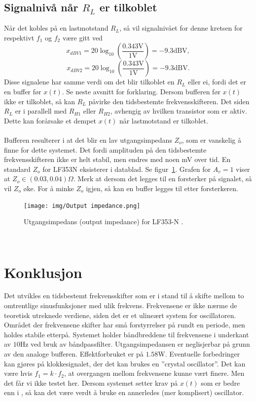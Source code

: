 \documentclass[a4paper,11pt,norsk]{article}
\begin{document}
\subsection{Signalnivå når $R_L$ er tilkoblet}
Når det kobles på en lastmotstand $R_L$, så vil signalnivået for denne kretsen for respektivt $f_1$ og $f_2$ være gitt ved
\begin{equation}
    x_{dBV1} = 20\log_{10}\left(\frac{0.343\textrm{V}}{1\textrm{V}}\right) = -9.3\textrm{dBV},
\end{equation}
\begin{equation}
    x_{dBV2} = 20\log_{10}\left(\frac{0.343\textrm{V}}{1\textrm{V}}\right) = -9.3\textrm{dBV}.
\end{equation}
Disse signalene har samme verdi om det blir tilkoblet en $R_L$ eller ei, fordi det er en buffer før $x(t)$. Se neste avsnitt for forklaring. Dersom bufferen før $x(t)$ ikke er tilkoblet, så kan $R_L$ påvirke den tidsbestemte frekvensskifteren. Det siden $R_L$ er i parallell med $R_{H1}$ eller $R_{H2}$, avhengig av hvilken transistor som er aktiv. Dette kan forårsake et dempet $x(t)$ når lastmotstand er tilkoblet. 
\\\\
Bufferen resulterer i at det blir en lav utgangsimpedans $Z_o$, som er vanskelig å finne for dette systemet. Det fordi amplituden på den tidsbestemte frekvensskifteren ikke er helt stabil, men endres med noen mV over tid. En standard $Z_o$ for LF353N eksisterer i datablad. Se figur~\ref{fig: LF353N output impedance}. Grafen for $A_v = 1$ viser at $Z_o \in (0.03, 0.04)\Omega$. Merk at dersom det legges til en forsterker på signalet, så vil $Z_o$ øke. For å minke $Z_o$ igjen, så kan en buffer legges til etter forsterkeren. \\
\begin{figure}[!htbp]
    \centering
    \texttt{[image: img/Output impedance.png]}
    \caption{Utgangsimpedans (output impedance) for LF353-N \cite{LF353N Datasheet}.}
    \label{fig: LF353N output impedance}
\end{figure} \\
\newpage
\section{Konklusjon}
\label{sec: konklusjon}
Det utvikles en tidsbestemt frekvensskifter som er i stand til å skifte mellom to omtrentlige sinusfunksjoner med ulik frekvens. Frekvensene er ikke nærme de teoretisk utreknede verdiene, siden det er et ulineært system for oscillatoren. Området der frekvensene skifter har små forstyrrelser på rundt en periode, men holdes stabile etterpå. Systemet holder båndbreddene til frekvensene i underkant av $10$Hz ved bruk av båndpassfilter. Utgangsimpedansen er neglisjerbar på grunn av den analoge bufferen. Effektforbruket er på $1.58$W. Eventuelle forbedringer kan gjøres på klokkesignalet, der det kan brukes en ''crystal oscillator''. Det kan være hvis $f_1 = k\cdot f_2$, at overgangen mellom frekvensene kunne vært finere. Men det får vi ikke testet her. Dersom systemet setter krav på $x(t)$ som er bedre enn i \cite{U-oscillator}, så kan det være verdt å bruke en annerledes (mer komplisert) oscillator.
\end{document}
